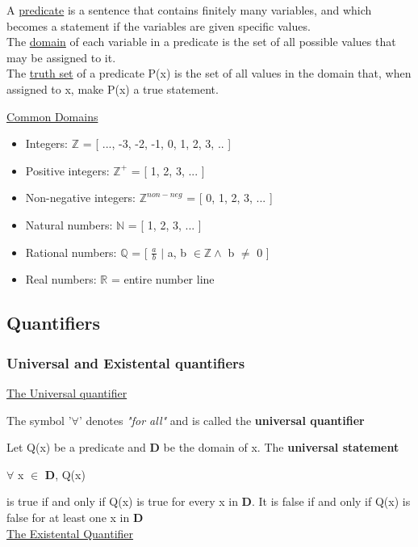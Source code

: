 \documentclass{article}
\begin{document}
A \underline{predicate} is a sentence that contains finitely many variables, and which becomes a statement if the variables are given
specific values. \\

The \underline{domain} of each variable in a predicate is the set of all possible values that may be assigned to it. \\

The \underline{truth set} of a predicate P(x) is the set of all values in the domain that, when assigned to x, make P(x) a true statement.

\underline{Common Domains}
\begin{itemize}
\item Integers: $\mathbb{Z}$ = [ ..., -3, -2, -1, 0, 1, 2, 3, .. ]
\item Positive integers: $\mathbb{Z}^{+}$ = [ 1, 2, 3, ... ]
\item Non-negative integers: $\mathbb{Z}^{non-neg}$ = [ 0, 1, 2, 3, ... ]
\item Natural numbers: $\mathbb{N}$ = [ 1, 2, 3, ... ]
\item Rational numbers: $\mathbb{Q}$ = [ $\frac{a}{b}$ $|$ a, b $\in \mathbb{Z} \wedge$ b $\neq$ 0 ]
\item Real numbers: $\mathbb{R}$ = entire number line
\end{itemize}

\subsection{Quantifiers}

\subsubsection{Universal and Existental quantifiers}

\underline{The Universal quantifier}

The symbol '$\forall$' denotes \textit{"for all"} and is called the \textbf{universal quantifier}

Let Q(x) be a predicate and \textbf{D} be the domain of x. The \textbf{universal statement}

$\forall$ x $\in$ \textbf{D}, Q(x)

is true if and only if Q(x) is true for every x in \textbf{D}. It is false if and only if Q(x) is false for at least one x in \textbf{D} \\

\underline{The Existental Quantifier}
\end{document}
